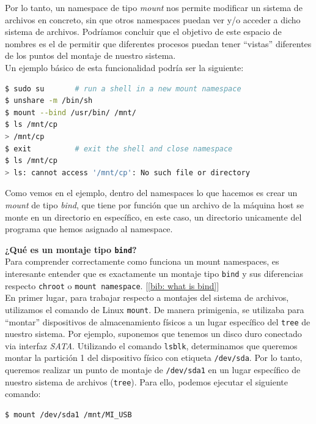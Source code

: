 \documentclass[a4paper, oneside, 12pt]{book}
\begin{document}
	\par \noindent Por lo tanto, un namespace de tipo \textit{mount} nos permite modificar un sistema de archivos en concreto, sin que otros namespaces puedan ver y/o acceder a dicho sistema de archivos. Podríamos concluir que el objetivo de este espacio de nombres es el de permitir que diferentes procesos puedan tener ``vistas'' diferentes de los puntos del montaje de nuestro sistema. \\
	
	
	\noindent Un ejemplo básico de esta funcionalidad podría ser la siguiente:
	
	\addvspace{10px}
	
	\begin{lstlisting}[language=bash, caption=Uso de \texttt{mount namespace} con ``bind'']
$ sudo su		# run a shell in a new mount namespace
$ unshare -m /bin/sh
$ mount --bind /usr/bin/ /mnt/
$ ls /mnt/cp
> /mnt/cp
$ exit			# exit the shell and close namespace
$ ls /mnt/cp
> ls: cannot access '/mnt/cp': No such file or directory
	\end{lstlisting}

	\addvspace{10px}
	
	\par \noindent Como vemos en el ejemplo, dentro del namespaces lo que hacemos es crear un \textit{mount} de tipo \textit{bind}, que tiene por función que un archivo de la máquina host se monte en un directorio en específico, en este caso, un directorio unicamente del programa que hemos asignado al namespace. 
	
	\pagebreak
	
	\noindent \textbf{\large ¿Qué es un montaje tipo \texttt{bind}?}\\
	
	\noindent Para comprender correctamente como funciona un mount namespaces, es interesante entender que es exactamente un montaje tipo \texttt{bind} y sus diferencias respecto \texttt{chroot} o \texttt{mount namespace}. [\ref{bib: what is bind}] \\
	
	\noindent En primer lugar, para trabajar respecto a montajes del sistema de archivos, utilizamos el comando de Linux \texttt{mount}. De manera primigenia, se utilizaba para ``montar'' dispositivos de almacenamiento físicos a un lugar específico del \texttt{tree} de nuestro sistema. Por ejemplo, suponemos que tenemos un disco duro conectado via interfaz \textit{SATA}. Utilizando el comando \texttt{lsblk}, determinamos que queremos montar la partición 1 del dispositivo físico con etiqueta \texttt{/dev/sda}. Por lo tanto, queremos realizar un punto de montaje de \texttt{/dev/sda1} en un lugar específico de nuestro sistema de archivos (\texttt{tree}). Para ello, podemos ejecutar el siguiente comando:
	\begin{verbatim}
$ mount /dev/sda1 /mnt/MI_USB
	\end{verbatim}
\end{document}
